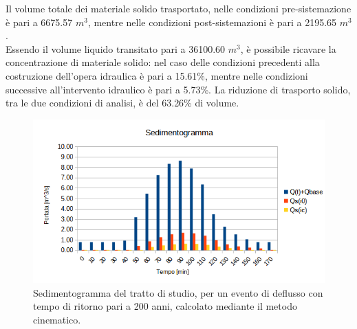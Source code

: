 Il volume totale dei materiale solido trasportato, nelle condizioni pre-sistemazione è pari a 6675.57 $m^3$, mentre nelle condizioni post-sistemazioni è pari a 2195.65 $m^3$.\\
Essendo il volume liquido transitato pari a 36100.60 $m^3$, è possibile ricavare la concentrazione di materiale solido: nel caso delle condizioni precedenti alla costruzione dell'opera idraulica è pari a 15.61\%, mentre nelle condizioni successive all'intervento idraulico è pari a 5.73\%. La riduzione di trasporto solido, tra le due condizioni di analisi, è del 63.26\% di volume.

\begin{figure}[H] \centering
    \includegraphics[scale=0.75]{immagini/sedimentogramma.png}
    \caption{Sedimentogramma del tratto di studio, per un evento di deflusso con tempo di ritorno pari a 200 anni, calcolato mediante il metodo cinematico.}
    \label{sedimentogramma}
\end{figure}

